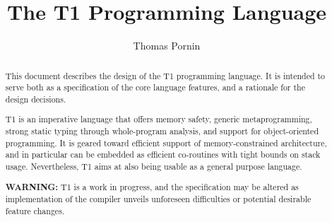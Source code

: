 \documentclass[12pt]{article}
\title{\textsf{\textbf{The T1 Programming Language}}}
\author{Thomas Pornin}
\begin{document}
\maketitle

\begin{abstract}
\noindent This document describes the design of the T1 programming
language. It is intended to serve both as a specification of the core
language features, and a rationale for the design decisions.

\vspace{2ex}
\noindent T1 is an imperative language that offers memory safety,
generic metaprogramming, strong static typing through whole-program
analysis, and support for object-oriented programming. It is geared
toward efficient support of memory-constrained architecture, and in
particular can be embedded as efficient co-routines with tight bounds
on stack usage. Nevertheless, T1 aims at also being usable as a
general purpose language.

\vspace{2ex}
\noindent \textbf{\textsf{WARNING:}} T1 is a work in progress, and the
specification may be altered as implementation of the compiler unveils
unforeseen difficulties or potential desirable feature changes.
\end{abstract}

\newpage

\newpage

\newpage

\newpage

\newpage

\newpage

\newpage

\end{document}

